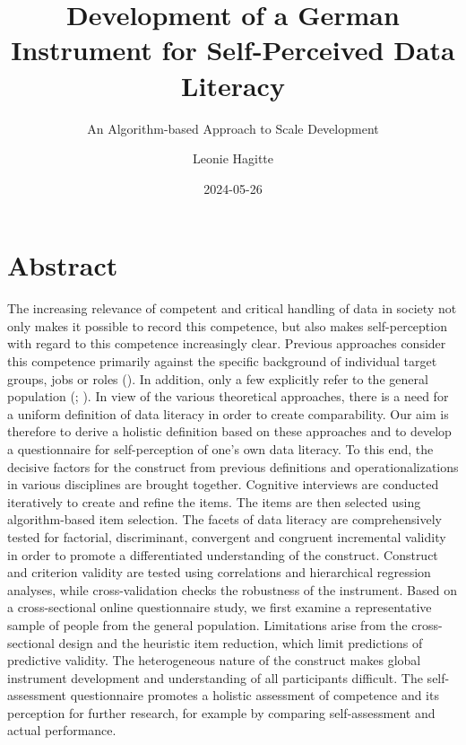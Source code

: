 \documentclass[
  12pt,
  a4paper,
  twoside]{article}
\title{Development of a German Instrument for Self-Perceived Data Literacy}
\subtitle{An Algorithm-based Approach to Scale Development}
\author{Leonie Hagitte}
\date{2024-05-26}
\begin{document}
\maketitle

{
\setcounter{tocdepth}{2}
\tableofcontents
}
\newpage\null\thispagestyle{empty}\newpage

\section*{Abstract}\label{abstract}

The increasing relevance of competent and critical handling of data in society not only makes it possible to record this competence, but also makes self-perception with regard to this competence increasingly clear. Previous approaches consider this competence primarily against the specific background of individual target groups, jobs or roles (). In addition, only a few explicitly refer to the general population (; ). In view of the various theoretical approaches, there is a need for a uniform definition of data literacy in order to create comparability.
Our aim is therefore to derive a holistic definition based on these approaches and to develop a questionnaire for self-perception of one's own data literacy. To this end, the decisive factors for the construct from previous definitions and operationalizations in various disciplines are brought together. Cognitive interviews are conducted iteratively to create and refine the items. The items are then selected using algorithm-based item selection. The facets of data literacy are comprehensively tested for factorial, discriminant, convergent and congruent incremental validity in order to promote a differentiated understanding of the construct. Construct and criterion validity are tested using correlations and hierarchical regression analyses, while cross-validation checks the robustness of the instrument.
Based on a cross-sectional online questionnaire study, we first examine a representative sample of people from the general population. Limitations arise from the cross-sectional design and the heuristic item reduction, which limit predictions of predictive validity. The heterogeneous nature of the construct makes global instrument development and understanding of all participants difficult.
The self-assessment questionnaire promotes a holistic assessment of competence and its perception for further research, for example by comparing self-assessment and actual performance.
\end{document}
